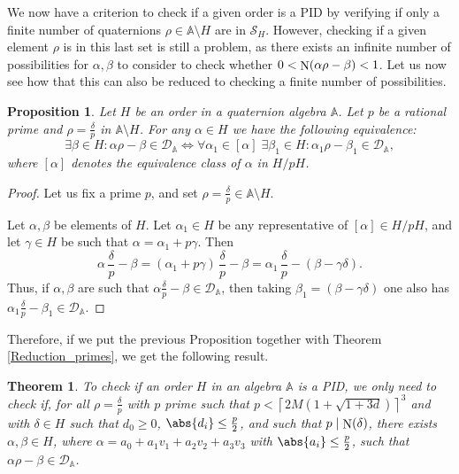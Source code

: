 \documentclass[10pt]{article}
\newtheorem{theorem}{Theorem}
\newtheorem{proposition}{Proposition}
\theoremstyle{definition}
\newcommand\A{\mathbb{A}}
\newcommand\DD{\mathcal{D}}
\newcommand\SC{\mathcal{S}}
\newcommand\N{\mathop{\rm N}\nolimits}
\begin{document}
We now have a criterion to check if a given order is a PID by
verifying if only a finite number of quaternions
$\rho \in \A \setminus H$ are in $\SC_H$. However, checking if a given
element $\rho$ is in this last set is still a problem, as there exists
an infinite number of possibilities for $\alpha, \beta$ to consider to
check whether $0 <\N(\alpha \rho - \beta) <1$. Let us now see how that
this can also be reduced to checking a finite number of possibilities.

\begin{proposition}
  Let $H$ be an order in a quaternion algebra $\A$. Let $p$ be a
  rational prime and $\rho = \frac{\delta}{p}$ in $\A \setminus
  H$. For any $\alpha \in H$ we have the following equivalence:
  \[ \exists \beta\in H \colon \alpha \rho - \beta \in \DD_\A \iff
    \forall \alpha_1 \in [\alpha]\; \exists \beta_1\in H \colon
    \alpha_1 \rho - \beta_1 \in \DD_\A, \]
  where $[\alpha]$ denotes the equivalence class of $\alpha$ in
  $H/pH$.
\end{proposition}

\begin{proof}
  Let us fix a prime $p$, and set
  $\rho = \frac{\delta}{p} \in \A \setminus H$.
	
  Let $\alpha, \beta$ be elements of $H$. Let $\alpha_1 \in H$ be any
  representative of $[\alpha] \in H/pH$, and let $\gamma \in H$ be
  such that $\alpha = \alpha_1 + p \gamma$. Then
  \[\alpha\, \frac{\delta}{p} - \beta = (\alpha_1 + p \gamma)\,
    \frac{\delta}{p} - \beta = \alpha_1\, \frac{\delta}{p} - (\beta -
    \gamma \delta). \]
  Thus, if $\alpha, \beta$ are such that
  $\alpha \frac{\delta}{p} - \beta \in \DD_\A$, then taking
  $\beta_1 = (\beta - \gamma \delta)$ one also has
  $\alpha_1 \frac{\delta}{p} - \beta_1 \in \DD_\A$.
\end{proof}

Therefore, if we put the previous Proposition together with Theorem
\ref{Reduction_primes}, we get the following result.

\begin{theorem}\label{Reduction_alphas}
  To check if an order $H$ in an algebra $\A$ is a PID, we only need
  to check if, for all $\rho= \frac{\delta}{p}$ with $p$ prime such
  that $p < \left \lceil 2 M (1+\sqrt{1+3d}) \right \rceil ^3$ and
  with $\delta \in H$ such that $d_0\geq 0$,
  $\abs{d_i} \leq \frac{p}{2}$, and such that $p \mid \N(\delta)$,
  there exists $\alpha, \beta \in H$, where
  $\alpha = a_0 + a_1 v_1 + a_2 v_2 + a_3 v_3$ with
  $\abs{a_i} \leq \frac{p}{2}$, such that
  $\alpha \rho - \beta \in \DD_\A$.
\end{theorem}
\end{document}
